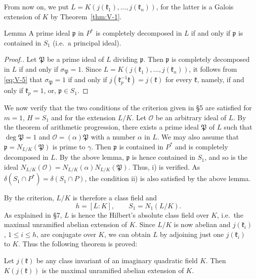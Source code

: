 From now on, we put $L=K(j(\mathfrak{k}_{1}),\ldots,j(\mathfrak{k}_{n}))$,
for the latter is a Galois extension of $K$ by
Theorem~\ref{thm:V-1}.

\begin{namedstmt}{Lemma}
A prime ideal $\mathfrak{p}$ in $P^{*}$ is completely decomposed in $L$
if and only if $\mathfrak{p}$ is contained in $S_{1}$ (i.e.\ a principal
ideal).
\end{namedstmt}

\begin{proof}[Proof.]
Let $\mathfrak{P}$ be a prime ideal of $L$ dividing $\mathfrak{p}$. Then
$\mathfrak{p}$ is completely decomposed in $L$ if and only if
$\sigma_{\mathfrak{P}}=1$. Since
$L=K(j(\mathfrak{k}_{1}),\ldots,j(\mathfrak{k}_{n}))$, it follows from
\eqref{eq:V-5} that $\sigma_{\mathfrak{P}}=1$ if and only if
$j(\mathfrak{k}_{p}^{-1}\mathfrak{k})=j(\mathfrak{k})$ for every
$\mathfrak{k}$, namely, if and only if $\mathfrak{k}_{p}=1$, or,
$\mathfrak{p}\in S_{1}$.
\end{proof}

We now verify that the two conditions of the criterion given in §5 are
satisfied for $m=1$, $H=S_{1}$ and for the extension $L/K$. Let
$\mathcal{O}$ be an arbitrary ideal of $L$. By the theorem of arithmetic
progression, there exists a prime ideal $\mathfrak{P}$ of $L$ such that
$\deg\mathfrak{P}=1$ and $\mathcal{O}=(\alpha)\mathfrak{P}$ with a number
$\alpha$ in $L$. We may also assume that
$\mathfrak{p}=N_{L/K}(\mathfrak{P})$ is prime to $\gamma$. Then
$\mathfrak{p}$ is contained in $P^{*}$ and is completely decomposed in
$L$. By the above lemma, $\mathfrak{p}$ is hence contained in $S_{1}$,
and so is the ideal
$N_{L/K}(\mathcal{O})=N_{L/K}(\alpha)N_{L/K}(\mathfrak{P})$. Thus, i) is
verified. As $\delta(S_{1}\cap P^{*})=\delta(S_{1}\cap P)$, the condition
ii) is also satisfied by the above lemma.

By the criterion, $L/K$ is therefore a class field and
\[
h=[L:K],\qquad S_{1}=N_{1}(L/K).
\]
As explained in §7, $L$ is hence the Hilbert's absolute class field over
$K$, i.e.\ the maximal unramified abelian extension of $K$. Since $L/K$
is now abelian and $j(\mathfrak{k}_{i})$, $1\leq i\leq h$, are conjugate
over $K$, we can obtain $L$ by adjoining just one $j(\mathfrak{k}_{i})$ to
$K$. Thus the following theorem is proved:

\begin{theorem}\label{thm:V-2}
Let $j(\mathfrak{k})$ be any class invariant of an imaginary quadratic
field $K$. Then $K(j(\mathfrak{k}))$ is the maximal unramified abelian
extension of $K$.
\end{theorem}

